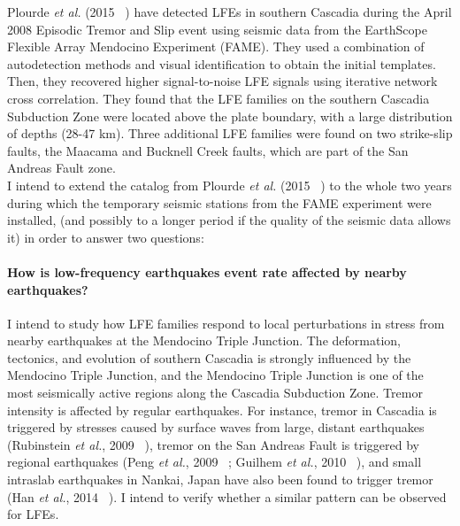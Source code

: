 \documentclass[letterpaper, 12pt]{article}
\begin{document}
Plourde \textit{et al.} (2015 ~\cite{PLO_2015}) have detected LFEs in southern Cascadia during the April 2008 Episodic Tremor and Slip event using seismic data from the EarthScope Flexible Array Mendocino Experiment (FAME). They used a combination of autodetection methods and visual identification to obtain the initial templates. Then, they recovered higher signal-to-noise LFE signals using iterative network cross correlation. They found that the LFE families on the southern Cascadia Subduction Zone were located above the plate boundary, with a large distribution of depths (28-47 km). Three additional LFE families were found on two strike-slip faults, the Maacama and Bucknell Creek faults, which are part of the San Andreas Fault zone. \\

I intend to extend the catalog from Plourde \textit{et al.} (2015 ~\cite{PLO_2015}) to the whole two years during which the temporary seismic stations from the FAME experiment were installed, (and possibly to a longer period if the quality of the seismic data allows it) in order to answer two questions:

\paragraph{How is low-frequency earthquakes event rate affected by nearby earthquakes?} I intend to study how LFE families respond to local perturbations in stress from nearby earthquakes at the Mendocino Triple Junction. The deformation, tectonics, and evolution of southern Cascadia is strongly influenced by the Mendocino Triple Junction, and the Mendocino Triple Junction is one of the most seismically active regions along the Cascadia Subduction Zone. Tremor intensity is affected by regular earthquakes. For instance, tremor in Cascadia is triggered by stresses caused by surface waves from large, distant earthquakes (Rubinstein \textit{et al.}, 2009 ~\cite{RUB_2009}), tremor on the San Andreas Fault is triggered by regional earthquakes (Peng \textit{et al.}, 2009 ~\cite{PEN_2009}; Guilhem \textit{et al.}, 2010 ~\cite{GUI_2010}), and small intraslab earthquakes in Nankai, Japan have also been found to trigger tremor (Han \textit{et al.}, 2014 ~\cite{HAN_2014}). I intend to verify whether a similar pattern can be observed for LFEs. 
\end{document}
